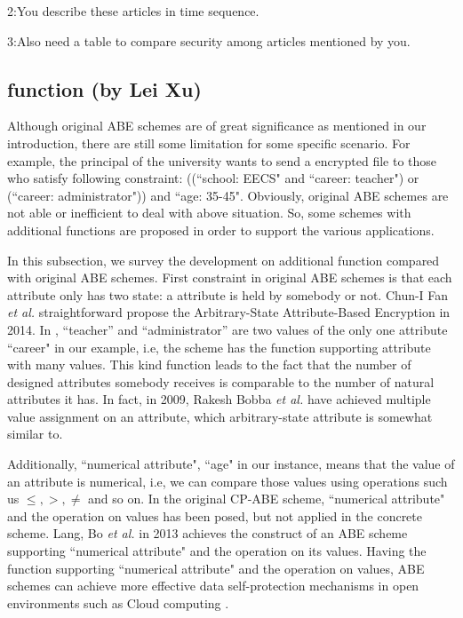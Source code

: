 2:You describe these articles in time sequence.

3:Also need a table to compare security among articles mentioned by you.

\subsection{function (by Lei Xu)}
Although original ABE schemes are of great significance as mentioned in our introduction,
there are still some limitation for some specific scenario.
For example, the principal of the university wants to send a encrypted file to those who satisfy following constraint:
((``school: EECS" and ``career: teacher") or (``career: administrator")) and ``age: 35-45".
Obviously, original ABE schemes are not able or inefficient to deal with above situation.
So, some schemes with additional functions are proposed in order to support the various applications.

In this subsection, we survey the development on additional function compared with original ABE schemes.
First constraint in original ABE schemes is that each attribute only has two state: a attribute is held by somebody or not.
Chun-I Fan \emph{et al.} \cite{Fan:TOC'14} straightforward propose the Arbitrary-State Attribute-Based Encryption in 2014.
In \cite{Fan:TOC'14}, ``teacher'' and ``administrator'' are two values of the only one attribute ``career" in our example,
i.e, the scheme has the function supporting attribute with many values.
This kind function leads to the fact that the number of designed attributes somebody receives is comparable to the number of natural attributes it has.
In fact, in 2009,
Rakesh Bobba \emph{et al.} \cite{Bobba:ESORICS'09} have achieved multiple value assignment on an attribute, which arbitrary-state attribute is somewhat similar to.

Additionally, ``numerical attribute", ``age" in our instance, means that the value of an attribute is numerical, i.e,
we can compare those values using operations such us $\leq, >, \neq$ and so on.
In the original CP-ABE scheme\cite{Bethencourt:SP'07}, ``numerical attribute" and the operation on values has been posed,
but not applied in the concrete scheme.
Lang, Bo \emph{et al.} \cite{Lang:SC'13} in 2013 achieves the construct of an ABE scheme supporting ``numerical attribute" and the operation on its values.
Having the function supporting ``numerical attribute" and the operation on values, ABE schemes can achieve more
effective data self-protection mechanisms in open environments such as Cloud computing \cite{Lang:SC'13}.

